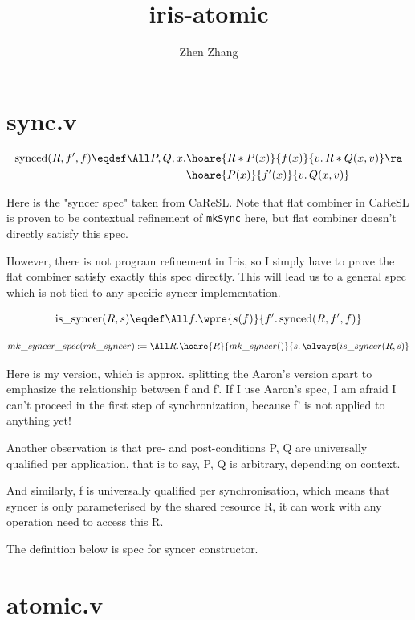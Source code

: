 \documentclass[10pt]{article}
\begin{document}
\title{\bfseries iris-atomic}
\author{Zhen Zhang}
\maketitle

\section{sync.v}

\begin{align}
  \text{synced}(R, f', f) \eqdef
  \All P, Q, x.
    &\hoare{ R * P(x)}{f(x)}{ v.\,R * Q(x,v) } \ra \\
    &\hoare{ P(x)}{f'(x)}{ v.\,Q(x,v) }
\end{align}

Here is the "syncer spec" taken from CaReSL. Note that flat combiner in CaReSL is proven to be contextual refinement of \texttt{mkSync} here, but flat combiner doesn't directly satisfy this spec.

However, there is not program refinement in Iris, so I simply have to prove the flat combiner satisfy exactly this spec directly. This will lead us to a general spec which is not tied to any specific syncer implementation.

\[
  \text{is\_syncer}(R, s) \eqdef
    \All f. \wpre{s(f)}{ f'.\, \text{synced}(R, f', f)} \]


\[
  mk\_syncer\_spec (mk\_syncer) :=
    \All R.
        \hoare{R}{mk\_syncer()}{ s.\,\always (is\_syncer(R, s)} \]

Here is my version, which is approx. splitting the Aaron’s version apart to emphasize the relationship between f and f’. If I use Aaron’s spec, I am afraid I can’t proceed in the first step of synchronization, because f’ is not applied to anything yet!

Another observation is that pre- and post-conditions P, Q are universally qualified per application, that is to say, P, Q is arbitrary, depending on context.

And similarly, f is universally qualified per synchronisation, which means that syncer is only parameterised by the shared resource R, it can work with any operation need to access this R.

The definition below is spec for syncer constructor.

\section{atomic.v}
\end{document}
